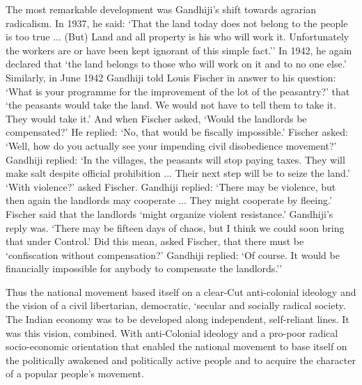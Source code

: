 The most remarkable development was Gandhiji's shift towards agrarian radicalism. In 1937, he said: `That the land today does not belong to the people is too true ... (But) Land and all property is his who will work it. Unfortunately the workers are or have been kept ignorant of this simple fact.'' In 1942, he again declared that `the land belongs to those who will work on it and to no one else.' Similarly, in June 1942 Gandhiji told Louis Fischer in answer to his question: `What is your programme for the improvement of the lot of the peasantry?' that `the peasants would take the land. We would not have to tell them to take it. They would take it.' And when Fischer asked, `Would the landlords be compensated?' He replied: `No, that would be fiscally impossible.' Fischer asked: `Well, how do you actually see your impending civil disobedience movement?' Gandhiji replied: `In the villages, the peasants will stop paying taxes. They will make salt despite official prohibition ... Their next step will be to seize the land.' `With violence?' asked Fischer. Gandhiji replied: `There may be violence, but then again the landlords may cooperate ... They might cooperate by fleeing.' Fischer said that the landlords `might organize violent resistance.' Gandhiji's reply was. `There may be fifteen days of chaos, but I think we could soon bring that under Control.' Did this mean, asked Fischer, that there must be `confiscation without compensation?' Gandhiji replied: `Of course. It would be financially impossible for anybody to compensate the landlords.''

Thus the national movement based itself on a clear-Cut anti-colonial ideology and the vision of a civil libertarian, democratic, `secular and socially radical society. The Indian economy was to be developed along independent, self-reliant lines. It was this vision, combined. With anti-Colonial ideology and a pro-poor radical socio-economic orientation that enabled the national movement to base itself on the politically awakened and politically active people and to acquire the character of a popular people's movement.

